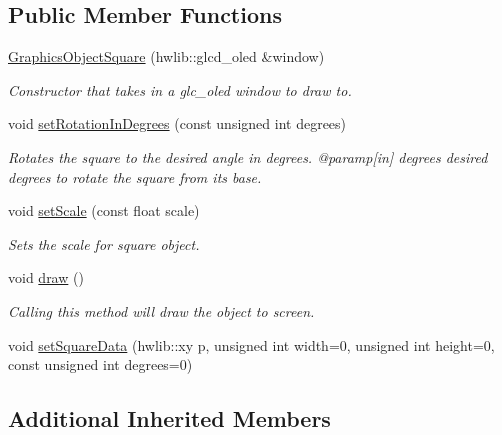 \subsection*{Public Member Functions}
\begin{DoxyCompactItemize}
\item 
\mbox{\hyperlink{class_graphics_object_square_af935eee79aab68a59befdf102f7f32a8}{Graphics\+Object\+Square}} (hwlib\+::glcd\+\_\+oled \&window)
\begin{DoxyCompactList}\small\item\em Constructor that takes in a glc\+\_\+oled window to draw to. \end{DoxyCompactList}\item 
\mbox{\label{class_graphics_object_square_afb2753b58b896a13f90e3269898a8a1d}} 
void \mbox{\hyperlink{class_graphics_object_square_afb2753b58b896a13f90e3269898a8a1d}{set\+Rotation\+In\+Degrees}} (const unsigned int degrees)
\begin{DoxyCompactList}\small\item\em Rotates the square to the desired angle in degrees. @paramp\mbox{[}in\mbox{]} degrees desired degrees to rotate the square from it\textquotesingle{}s base. \end{DoxyCompactList}\item 
void \mbox{\hyperlink{class_graphics_object_square_a92fc26cdb800858992f505a57f31e3aa}{set\+Scale}} (const float scale)
\begin{DoxyCompactList}\small\item\em Sets the scale for square object. \end{DoxyCompactList}\item 
\mbox{\label{class_graphics_object_square_a7e494e475f4f47a77e8dc0eead6136bd}} 
void \mbox{\hyperlink{class_graphics_object_square_a7e494e475f4f47a77e8dc0eead6136bd}{draw}} ()
\begin{DoxyCompactList}\small\item\em Calling this method will draw the object to screen. \end{DoxyCompactList}\item 
void \mbox{\hyperlink{class_graphics_object_square_abc8b9bacc687ce180f6a03ea6c8ee69b}{set\+Square\+Data}} (hwlib\+::xy p, unsigned int width=0, unsigned int height=0, const unsigned int degrees=0)
\end{DoxyCompactItemize}
\subsection*{Additional Inherited Members}


